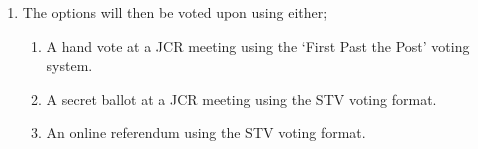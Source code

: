\begin{enumerate}
\begin{enumerate}
        \item The options will then be voted upon using either;
        \begin{enumerate}
            \item A hand vote at a JCR meeting using the ‘First Past the Post’ voting system. 
            \item A secret ballot at a JCR meeting using the STV voting format.
            \item An online referendum using the STV voting format.
        \end{enumerate}
    \end{enumerate}
    
\end{enumerate}

